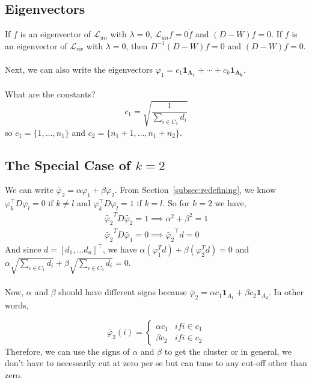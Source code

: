\documentclass[12pt]{article}
\theoremstyle{plain}
\begin{document}
\subsection{Eigenvectors}

If $ f $ is an eigenvector of $ \mathcal{L}_{un} $ with $ \lambda = 0 $, $ \mathcal{L}_{un} f = 0 \dot f $ and $ (D - W)f = 0 $.
If $ f $ is an eigenvector of $ \mathcal{L}_{rw} $ with $ \lambda = 0 $, then $ D^{-1} (D - W) f = 0 $ and $ (D - W)f = 0 $.
\\ \\
Next, we can also write the eigenvectors $ \varphi_{1} = c_1 \mathbf{1_{A_{1}}} + \cdots + c_k \mathbf{1_{A_{k}}} $.
\\ \\
What are the constants?
\[
c_1 = \sqrt{\frac{1}{\sum_{i \in C_1}d_i}}
\]
so $ c_1 = \{ 1, \ldots, n_1 \} $ and $ c_2 = \{ n_1 + 1, \ldots, n_1 + n_2 \} $.

\subsection{The Special Case of $ k = 2$}

We can write $ \widetilde{\varphi_2} = \alpha \varphi_{1}  + \beta \varphi_{2} $.
From Section~\ref{subsec:redefining}, we know $ \varphi_k^{\intercal} D \varphi_l = 0 $ if $ k \neq l $ and $ \varphi_k^{\intercal} D \varphi_l = 1 $ if $ k = l $. So for $k=2$ we have,
\begin{align*}
\widetilde{\varphi_2}^T D \widetilde{\varphi_2} = 1 \implies \alpha^2 + \beta^2 = 1 \\
\widetilde{\varphi_2}^T D \widetilde{\varphi_1} = 0 \implies \widetilde{\varphi_2}^{\intercal}d = 0
\end{align*}
And since $ d = [d_1, \ldots d_n]^{\intercal} $, we have $ \alpha(\varphi_{1}^Td) + \beta(\varphi_{2}^Td) = 0$ and $\alpha\sqrt{\sum_{i \in C_1}d_i}+\beta\sqrt{\sum_{i \in C_2}d_i} = 0$.
\\ \\
Now, $ \alpha $ and $ \beta $ should have different signs because $ \widetilde{\varphi_2} = \alpha c_1 \mathbf{1}_{A_1} + \beta c_2 \mathbf{1}_{A_2} $. In other words,

\[
\widetilde{\varphi_2} (i) =
\begin{cases}
  \alpha c_1 & if i \in c_1 \\
  \beta c_2 & if i \in c_2
\end{cases}
\]
Therefore, we can use the signs of $\alpha$ and $\beta$ to get the cluster or in general, we don't have to necessarily cut at zero per se but can tune to any cut-off other than zero.
\end{document}
